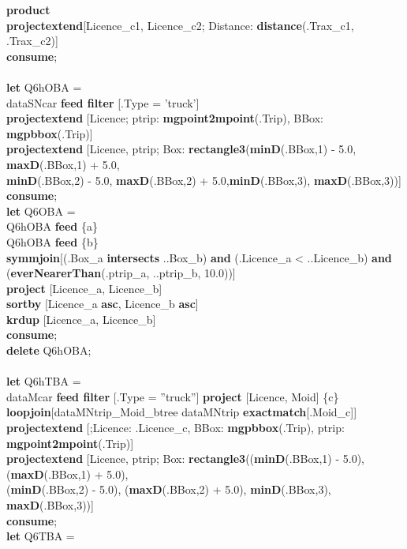 \documentclass[a4paper]{article}
\newcommand{\op}[1]{\textbf{#1}}
\begin{document}
\begin{scriptsize}
\begin{tabbing}
\>\op{product}\\
\>\op{projectextend}[Licence\_c1, Licence\_c2; Distance: \op{distance}(.Trax\_c1, .Trax\_c2)]\\
\op{consume};\\
\\
\op{let} Q6hOBA =\\
\>dataSNcar \op{feed filter} [.Type = 'truck']\\
\>\op{projectextend} [Licence; ptrip: \op{mgpoint2mpoint}(.Trip), BBox: \op{mgpbbox}(.Trip)]\\
\>\op{projectextend} [Licence, ptrip; Box: \op{rectangle3}(\op{minD}(.BBox,1) - 5.0, \op{maxD}(.BBox,1) + 5.0,\\
\>\>\>\>\op{minD}(.BBox,2) - 5.0, \op{maxD}(.BBox,2) + 5.0,\op{minD}(.BBox,3), \op{maxD}(.BBox,3))]\\
\op{consume};\\
\op{let} Q6OBA =\\
\>Q6hOBA \op{feed} \{a\}\\
\>Q6hOBA \op{feed} \{b\}\\
\>\op{symmjoin}[(.Box\_a \op{intersects} ..Box\_b) \op{and} (.Licence\_a < ..Licence\_b) \op{and}\\
\>\>\>\>(\op{everNearerThan}(.ptrip\_a, ..ptrip\_b, 10.0))]\\
\>\op{project} [Licence\_a, Licence\_b]\\
\>\op{sortby} [Licence\_a \op{asc}, Licence\_b \op{asc}]\\
\>\op{krdup} [Licence\_a, Licence\_b]\\
\op{consume};\\
\op{delete} Q6hOBA;\\
\\
\op{let} Q6hTBA =\\
\>dataMcar \op{feed filter} [.Type = ''truck''] \op{project} [Licence, Moid] \{c\}\\
\>\op{loopjoin}[dataMNtrip\_Moid\_btree dataMNtrip \op{exactmatch}[.Moid\_c]]\\
\>\op{projectextend} [;Licence: .Licence\_c, BBox: \op{mgpbbox}(.Trip), ptrip: \op{mgpoint2mpoint}(.Trip)]\\
\>\op{projectextend} [Licence, ptrip; Box: \op{rectangle3}((\op{minD}(.BBox,1) - 5.0), (\op{maxD}(.BBox,1) + 5.0),\\
\>\>\>\>(\op{minD}(.BBox,2) - 5.0), (\op{maxD}(.BBox,2) + 5.0), \op{minD}(.BBox,3), \op{maxD}(.BBox,3))]\\
\op{consume};\\
\op{let} Q6TBA =\\

\end{tabbing}
\end{scriptsize}
\end{document}
